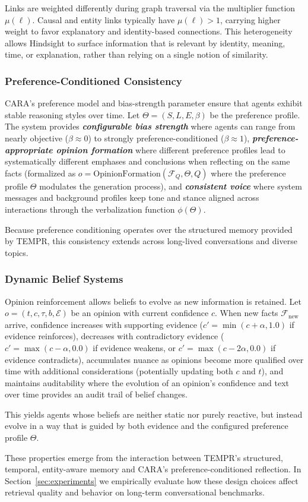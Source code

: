 Links are weighted differently during graph traversal via the multiplier function $\mu(\ell)$. Causal and entity links typically have $\mu(\ell) > 1$, carrying higher weight to favor explanatory and identity-based connections. This heterogeneity allows Hindsight to surface information that is relevant by identity, meaning, time, or explanation, rather than relying on a single notion of similarity.

\subsubsection{Preference-Conditioned Consistency}

CARA's preference model and bias-strength parameter ensure that agents exhibit stable reasoning styles over time. Let $\Theta = (S, L, E, \beta)$ be the preference profile. The system provides \textbf{\textit{configurable bias strength}} where agents can range from nearly objective ($\beta \approx 0$) to strongly preference-conditioned ($\beta \approx 1$), \textbf{\textit{preference-appropriate opinion formation}} where different preference profiles lead to systematically different emphases and conclusions when reflecting on the same facts (formalized as $o = \text{OpinionFormation}(\mathcal{F}_Q, \Theta, Q)$ where the preference profile $\Theta$ modulates the generation process), and \textbf{\textit{consistent voice}} where system messages and background profiles keep tone and stance aligned across interactions through the verbalization function $\phi(\Theta)$.

Because preference conditioning operates over the structured memory provided by TEMPR, this consistency extends across long-lived conversations and diverse topics.

\subsubsection{Dynamic Belief Systems}

Opinion reinforcement allows beliefs to evolve as new information is retained. Let $o = (t, c, \tau, b, \mathcal{E})$ be an opinion with current confidence $c$. When new facts $\mathcal{F}_{\text{new}}$ arrive, confidence increases with supporting evidence ($c' = \min(c + \alpha, 1.0)$ if evidence reinforces), decreases with contradictory evidence ($c' = \max(c - \alpha, 0.0)$ if evidence weakens, or $c' = \max(c - 2\alpha, 0.0)$ if evidence contradicts), accumulates nuance as opinions become more qualified over time with additional considerations (potentially updating both $c$ and $t$), and maintains auditability where the evolution of an opinion's confidence and text over time provides an audit trail of belief changes.

This yields agents whose beliefs are neither static nor purely reactive, but instead evolve in a way that is guided by both evidence and the configured preference profile $\Theta$.

These properties emerge from the interaction between TEMPR's structured, temporal, entity-aware memory and CARA's preference-conditioned reflection. In Section~\ref{sec:experiments} we empirically evaluate how these design choices affect retrieval quality and behavior on long-term conversational benchmarks.
\fi

